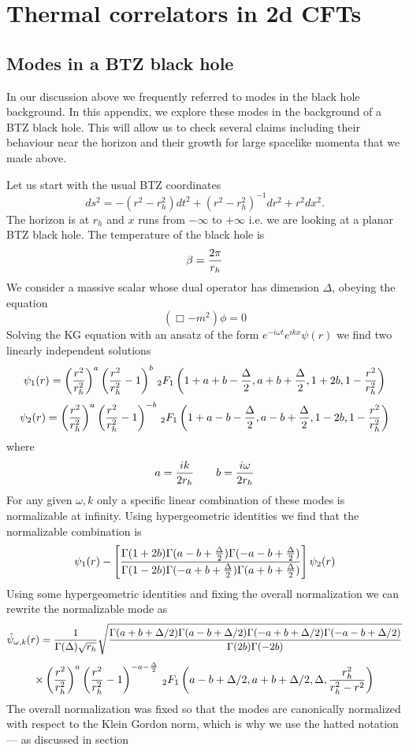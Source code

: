 \section{Thermal correlators in 2d CFTs}
\label{appendix2dthermal}
\subsection{Modes in a BTZ black hole}
In our discussion above we frequently referred to modes in the black
hole background. In this appendix, we explore these modes in the
background of a BTZ black hole. This will allow us to check several
claims including their behaviour near the horizon and their growth for
large spacelike momenta that we made above. 

Let us start with the usual BTZ coordinates
\[
ds^2 = -(r^2-r_h^2)dt^2 + (r^2-r_h^2)^{-1}dr^2 + r^2 dx^2.
\]
The horizon is at $r_h$ and $x$ runs from $-\infty$ to $+\infty$ i.e. we are looking at a planar BTZ black hole. The temperature of the black hole is
\[
\beta = {2\pi \over r_h}
\]
We consider a massive scalar whose dual operator has dimension $\Delta$, obeying the equation
\[
(\Box -m^2)\phi=0
\]
Solving the KG equation with an ansatz of the form $e^{-i\omega t}e^{i k x}\psi(r)$ we find two linearly independent solutions
\[
\psi_1(r)=\left({r^2\over r_h^2}\right)^a\left({r^2\over r_h^2}-1\right)^b \, _2F_1\left(1+a+b-{\Delta \over 2},a+b+{\Delta \over 2},1+2b,1-{r^2\over r_h^2}\right)
\]
\[
\psi_2(r) =\left({r^2\over r_h^2}\right)^{a}\left({r^2\over r_h^2}-1\right)^{-b}\, _2F_1\left(1+a-b-{\Delta
\over 2},a-b+{\Delta \over 2},1-2b,1-{r^2 \over r_h^2} \right)
\]
where 
\[
a = {i k \over 2 r_h}\qquad b= {i \omega \over 2r_h}
\]
For any given $\omega,k$ only a specific linear combination of these modes is normalizable at infinity. Using hypergeometric identities we find that the normalizable combination is
\[
\psi_1(r) -\left[{\Gamma(1+2b)\Gamma(a-b+{\Delta\over 2})
\Gamma(-a-b+{\Delta\over 2})\over \Gamma(1-2b) \Gamma(-a+b+{\Delta \over 2})
\Gamma(a+b+{\Delta \over 2})}\right]\psi_2(r)
\]
Using some hypergeometric identities and fixing the overall normalization we can rewrite the normalizable mode as
\[
\hat{\psi}_{\omega,k}(r) = {1\over \Gamma(\Delta)\sqrt{r_h}}\sqrt{\Gamma(a+b+\Delta/2)\Gamma(a-b+\Delta/2)
\Gamma(-a+b+\Delta/2)\Gamma(-a-b+\Delta/2)\over \Gamma(2b)\Gamma(-2b)}
\]
\[
\times \left({r^2\over r_h^2}\right)^a \left({r^2\over r_h^2}-1 \right)^{-a-{\Delta\over 2}}
{ \, _2 F_1\left(a-b+\Delta/2,a+b+\Delta/2,\Delta,{r_h^2 \over r_h^2-r^2}\right)}
\]
The overall normalization was fixed so that the modes are canonically normalized with respect to the Klein Gordon norm, which is why we use the hatted notation --- as discussed in section
